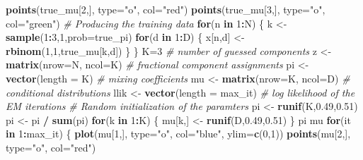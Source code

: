 \documentclass[]{article}
\newenvironment{Shaded}{\begin{snugshade}}{\end{snugshade}}
\newcommand{\KeywordTok}[1]{\textcolor[rgb]{0.13,0.29,0.53}{\textbf{#1}}}
\newcommand{\DataTypeTok}[1]{\textcolor[rgb]{0.13,0.29,0.53}{#1}}
\newcommand{\DecValTok}[1]{\textcolor[rgb]{0.00,0.00,0.81}{#1}}
\newcommand{\FloatTok}[1]{\textcolor[rgb]{0.00,0.00,0.81}{#1}}
\newcommand{\StringTok}[1]{\textcolor[rgb]{0.31,0.60,0.02}{#1}}
\newcommand{\CommentTok}[1]{\textcolor[rgb]{0.56,0.35,0.01}{\textit{#1}}}
\newcommand{\ControlFlowTok}[1]{\textcolor[rgb]{0.13,0.29,0.53}{\textbf{#1}}}
\newcommand{\OperatorTok}[1]{\textcolor[rgb]{0.81,0.36,0.00}{\textbf{#1}}}
\newcommand{\NormalTok}[1]{#1}
\begin{document}
\begin{Shaded}
\begin{Highlighting}[]
\KeywordTok{points}\NormalTok{(true_mu[}\DecValTok{2}\NormalTok{,], }\DataTypeTok{type=}\StringTok{"o"}\NormalTok{, }\DataTypeTok{col=}\StringTok{"red"}\NormalTok{)}
\KeywordTok{points}\NormalTok{(true_mu[}\DecValTok{3}\NormalTok{,], }\DataTypeTok{type=}\StringTok{"o"}\NormalTok{, }\DataTypeTok{col=}\StringTok{"green"}\NormalTok{)}
\CommentTok{# Producing the training data}
\ControlFlowTok{for}\NormalTok{(n }\ControlFlowTok{in} \DecValTok{1}\OperatorTok{:}\NormalTok{N) \{}
\NormalTok{k <-}\StringTok{ }\KeywordTok{sample}\NormalTok{(}\DecValTok{1}\OperatorTok{:}\DecValTok{3}\NormalTok{,}\DecValTok{1}\NormalTok{,}\DataTypeTok{prob=}\NormalTok{true_pi)}
\ControlFlowTok{for}\NormalTok{(d }\ControlFlowTok{in} \DecValTok{1}\OperatorTok{:}\NormalTok{D) \{}
\NormalTok{x[n,d] <-}\StringTok{ }\KeywordTok{rbinom}\NormalTok{(}\DecValTok{1}\NormalTok{,}\DecValTok{1}\NormalTok{,true_mu[k,d])}
\NormalTok{\}}
\NormalTok{\}}
\NormalTok{K=}\DecValTok{3} \CommentTok{# number of guessed components}
\NormalTok{z <-}\StringTok{ }\KeywordTok{matrix}\NormalTok{(}\DataTypeTok{nrow=}\NormalTok{N, }\DataTypeTok{ncol=}\NormalTok{K) }\CommentTok{# fractional component assignments}
\NormalTok{pi <-}\StringTok{ }\KeywordTok{vector}\NormalTok{(}\DataTypeTok{length =}\NormalTok{ K) }\CommentTok{# mixing coefficients}
\NormalTok{mu <-}\StringTok{ }\KeywordTok{matrix}\NormalTok{(}\DataTypeTok{nrow=}\NormalTok{K, }\DataTypeTok{ncol=}\NormalTok{D) }\CommentTok{# conditional distributions}
\NormalTok{llik <-}\StringTok{ }\KeywordTok{vector}\NormalTok{(}\DataTypeTok{length =}\NormalTok{ max_it) }\CommentTok{# log likelihood of the EM iterations}
\CommentTok{# Random initialization of the paramters}
\NormalTok{pi <-}\StringTok{ }\KeywordTok{runif}\NormalTok{(K,}\FloatTok{0.49}\NormalTok{,}\FloatTok{0.51}\NormalTok{)}
\NormalTok{pi <-}\StringTok{ }\NormalTok{pi }\OperatorTok{/}\StringTok{ }\KeywordTok{sum}\NormalTok{(pi)}
\ControlFlowTok{for}\NormalTok{(k }\ControlFlowTok{in} \DecValTok{1}\OperatorTok{:}\NormalTok{K) \{}
\NormalTok{mu[k,] <-}\StringTok{ }\KeywordTok{runif}\NormalTok{(D,}\FloatTok{0.49}\NormalTok{,}\FloatTok{0.51}\NormalTok{)}
\NormalTok{\}}
\NormalTok{pi}
\NormalTok{mu}
\ControlFlowTok{for}\NormalTok{(it }\ControlFlowTok{in} \DecValTok{1}\OperatorTok{:}\NormalTok{max_it) \{}
\KeywordTok{plot}\NormalTok{(mu[}\DecValTok{1}\NormalTok{,], }\DataTypeTok{type=}\StringTok{"o"}\NormalTok{, }\DataTypeTok{col=}\StringTok{"blue"}\NormalTok{, }\DataTypeTok{ylim=}\KeywordTok{c}\NormalTok{(}\DecValTok{0}\NormalTok{,}\DecValTok{1}\NormalTok{))}
\KeywordTok{points}\NormalTok{(mu[}\DecValTok{2}\NormalTok{,], }\DataTypeTok{type=}\StringTok{"o"}\NormalTok{, }\DataTypeTok{col=}\StringTok{"red"}\NormalTok{)}

\end{Highlighting}
\end{Shaded}
\end{document}
